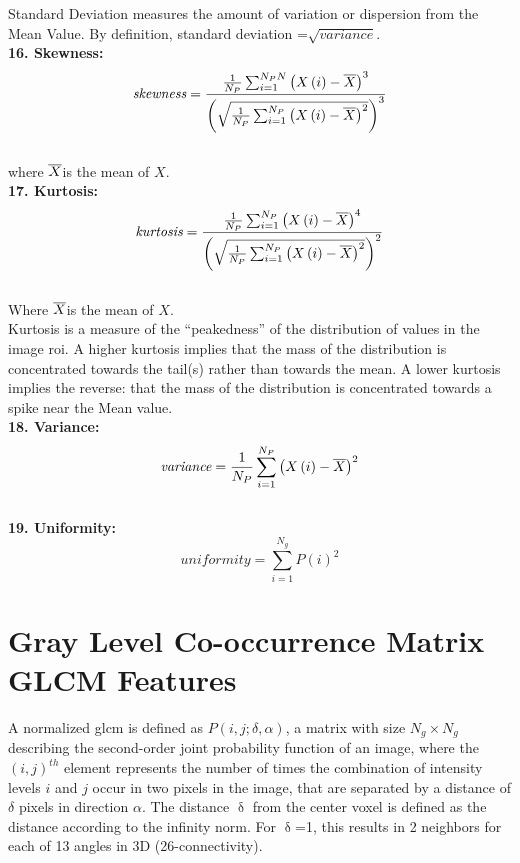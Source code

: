 {Standard Deviation measures the amount of variation or dispersion from the Mean Value. By definition, standard deviation =}$\sqrt{\textit{variance}}$.\\
{\textbf{16. Skewness:}}
\[\textit{skewness}=\frac{\frac{1}{N_{P}}\sum _{i=1}^{N_{P}N}\left(X\left(i\right)-\overline{X}\right)^{3}}{\left(\sqrt{\frac{1}{N_{P}}\sum _{i=1}^{N_{P}}\left(X\left(i\right)-\overline{X}\right)^{2}}\right)^{3}}\]\\
{where } $\overline{X}${is the mean of} $X$.\\
\textbf{17. Kurtosis:}\\
\[\textit{kurtosis}=\frac{\frac{1}{N_{P}}\sum _{i=1}^{N_{P}}\left(X\left(i\right)-\overline{X}\right)^{4}}{\left(\sqrt{\frac{1}{N_{P}}\sum _{i=1}^{N_{P}}\left(X\left(i\right)-\overline{X}\right)^{2}}\right)^{2}}\]\\
{Where } $\overline{X}${is the mean of} $X$.\\
{Kurtosis is a measure of the “peakedness” of the distribution of values in the image \ac{roi}. A higher kurtosis implies that the mass of the distribution is concentrated towards the tail(s) rather than towards the mean. A lower kurtosis implies the reverse: that the mass of the distribution is concentrated towards a spike near the Mean value.}\\
{\textbf{18. Variance:}}\\
\[\textit{variance}=\frac{1}{N_{P}}\sum _{i=1}^{N_{P}}\left(X\left(i\right)-\overline{X}\right)^{2}\]\\
\textbf{19. Uniformity:}\\
\[\textit{uniformity}=\sum _{i=1}^{N_{g}}P\left(i\right)^{2}\]



\section{Gray Level Co-occurrence Matrix GLCM Features}

A normalized \ac{glcm} is defined as $P\left(i,j;\delta ,\alpha \right)$, a matrix with size $N_{g}\times N_{g}$ describing the second-order joint probability function of an image, where the $\left(i,j\right)^{th}$ element represents the number of times the combination of intensity levels $i$ and $j$ occur in two pixels in the image, that are separated by a distance of $\delta $ pixels in direction $\alpha $. The distance $\updelta$ from the center voxel is defined as the distance according to the infinity norm. For $\updelta$=1, this results in 2 neighbors for each of 13 angles in 3D (26-connectivity).

